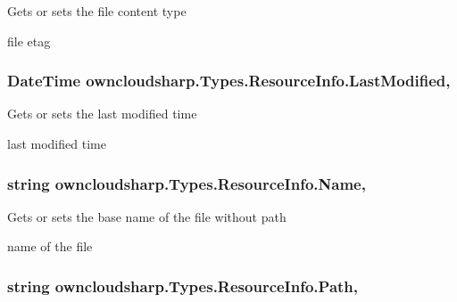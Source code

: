 Gets or sets the file content type 

file etag\hypertarget{classowncloudsharp_1_1_types_1_1_resource_info_af03ea962da598a33df3f098031566bf6}{}
\subsubsection[{Last\+Modified}]{\setlength{\rightskip}{0pt plus 5cm}Date\+Time owncloudsharp.\+Types.\+Resource\+Info.\+Last\+Modified\hspace{0.3cm}{\ttfamily [get]}, {\ttfamily [set]}}\label{classowncloudsharp_1_1_types_1_1_resource_info_af03ea962da598a33df3f098031566bf6}


Gets or sets the last modified time 

last modified time\hypertarget{classowncloudsharp_1_1_types_1_1_resource_info_a185e315b908518a2ab426ae3ed0c8281}{}
\subsubsection[{Name}]{\setlength{\rightskip}{0pt plus 5cm}string owncloudsharp.\+Types.\+Resource\+Info.\+Name\hspace{0.3cm}{\ttfamily [get]}, {\ttfamily [set]}}\label{classowncloudsharp_1_1_types_1_1_resource_info_a185e315b908518a2ab426ae3ed0c8281}


Gets or sets the base name of the file without path 

name of the file\hypertarget{classowncloudsharp_1_1_types_1_1_resource_info_a6ac3b97ca9a39dedb9de16ad5e80494f}{}
\subsubsection[{Path}]{\setlength{\rightskip}{0pt plus 5cm}string owncloudsharp.\+Types.\+Resource\+Info.\+Path\hspace{0.3cm}{\ttfamily [get]}, {\ttfamily [set]}}\label{classowncloudsharp_1_1_types_1_1_resource_info_a6ac3b97ca9a39dedb9de16ad5e80494f}


